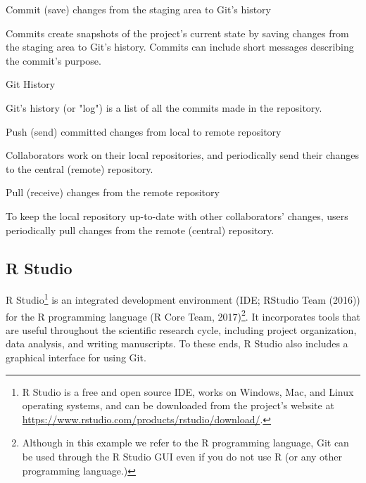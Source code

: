 \documentclass[
  american,
  ,doc,floatsintext]{apa6}
\begin{document}
\begin{tcolorbox}[colframe=green!50!black, colback=green!5, fonttitle=\small\bfseries, fontupper=\small, title=Box 2. Main Git operations and terms.]
\begin{compactitem}
    \end{compactitem}
Commit (save) changes from the staging area to Git's history
    \begin{compactitem}
    \item Commits create snapshots of the project's current state by saving changes from the staging area to Git's history. Commits can include short messages describing the commit's purpose.
    \end{compactitem}
Git History
    \begin{compactitem}
    \item Git's history (or "log") is a list of all the commits made in the repository.
    \end{compactitem}
Push (send) committed changes from local to remote repository
    \begin{compactitem}
    \item Collaborators work on their local repositories, and periodically send their changes to the central (remote) repository.
    \end{compactitem}
Pull (receive) changes from the remote repository
    \begin{compactitem}
    \item To keep the local repository up-to-date with other collaborators' changes, users periodically pull changes from the remote (central) repository. 
    \end{compactitem}
\end{tcolorbox}

\hypertarget{r-studio}{%
\subsection{R Studio}\label{r-studio}}

R Studio\footnote{R Studio is a free and open source IDE, works on Windows, Mac, and Linux operating systems, and can be downloaded from the project's website at \url{https://www.rstudio.com/products/rstudio/download/}.} is an integrated development environment (IDE; RStudio Team (2016)) for the R programming language (R Core Team, 2017)\footnote{Although in this example we refer to the R programming language, Git can be used through the R Studio GUI even if you do not use R (or any other programming language.)}. It incorporates tools that are useful throughout the scientific research cycle, including project organization, data analysis, and writing manuscripts. To these ends, R Studio also includes a graphical interface for using Git.
\end{document}
